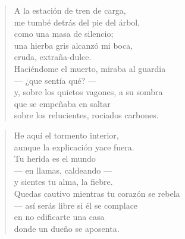 \newpage

\vspace*{-15mm}
\centeredornament




\begin{verse}
  A la estación de tren de carga, \\
  me tumbé detrás del pie del árbol, \\
  como una masa de silencio; \\
  una hierba gris alcanzó mi boca, \\
  cruda, extraña-dulce. \\
  Haciéndome el muerto, miraba al guardia \\
  --- ¿que sentía qué? --- \\
  y, sobre los quietos vagones, a su sombra \\
  que se empeñaba en saltar \\
  sobre los relucientes, rociados carbones. \\
\end{verse}

\bigskip



\begin{verse}
  He aquí el tormento interior, \\
  aunque la explicación yace fuera. \\
  Tu herida es el mundo \\
  --- en llamas, caldeando --- \\
  y sientes tu alma, la fiebre. \\
  Quedas cautivo mientras tu corazón se rebela \\
  --- así serás libre si él se complace \\
  en no edificarte una casa \\
  donde un dueño se aposenta. \\
\end{verse}


